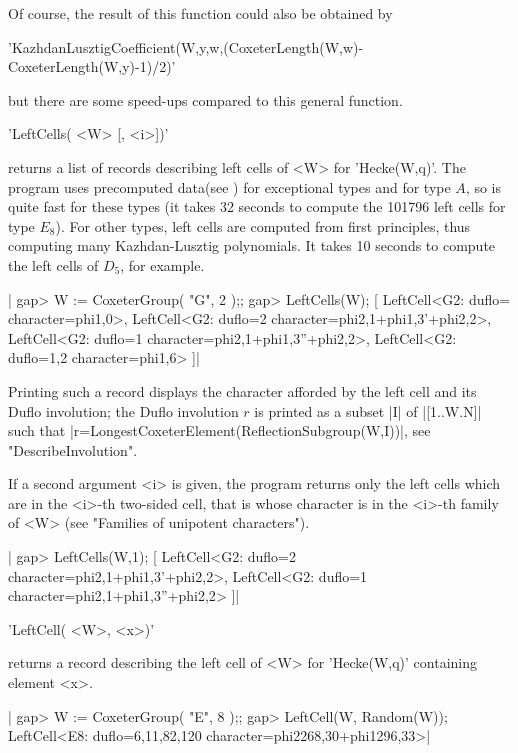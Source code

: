 Of course, the result of this function could also be obtained by

'KazhdanLusztigCoefficient(W,y,w,(CoxeterLength(W,w)-CoxeterLength(W,y)-1)/2)'

but there are some speed-ups compared to this general function.


'LeftCells( <W> [, <i>])'

returns  a list of  records describing left  cells of <W> for 'Hecke(W,q)'.
The  program uses  precomputed data(see  \cite{GH14}) for exceptional types
and  for type $A$, so is quite fast for these types (it takes 32 seconds to
compute  the 101796 left cells for type $E_8$). For other types, left cells
are  computed from  first principles,  thus computing  many Kazhdan-Lusztig
polynomials.  It takes 10 seconds  to compute the left  cells of $D_5$, for
example.

|    gap> W := CoxeterGroup( "G", 2 );;
    gap> LeftCells(W);
    [ LeftCell<G2: duflo= character=phi{1,0}>,
      LeftCell<G2: duflo=2 character=phi{2,1}+phi{1,3}'+phi{2,2}>,
      LeftCell<G2: duflo=1 character=phi{2,1}+phi{1,3}''+phi{2,2}>,
      LeftCell<G2: duflo=1,2 character=phi{1,6}> ]|

Printing such a record displays the character afforded by the left cell and
its  Duflo involution; the Duflo involution $r$  is printed as a subset |I|
of |[1..W.N]| such that |r=LongestCoxeterElement(ReflectionSubgroup(W,I))|,
see "DescribeInvolution".

If  a second argument <i> is given, the program returns only the left cells
which  are in the <i>-th two-sided cell,  that is whose character is in the
<i>-th family of <W> (see "Families of unipotent characters").

|    gap> LeftCells(W,1);
    [ LeftCell<G2: duflo=2 character=phi{2,1}+phi{1,3}'+phi{2,2}>,
      LeftCell<G2: duflo=1 character=phi{2,1}+phi{1,3}''+phi{2,2}> ]|


'LeftCell( <W>, <x>)'

returns  a  record  describing  the  left  cell  of  <W>  for  'Hecke(W,q)'
containing element <x>.

|    gap> W := CoxeterGroup( "E", 8 );;
    gap> LeftCell(W, Random(W));
    LeftCell<E8: duflo=6,11,82,120 character=phi{2268,30}+phi{1296,33}>|

